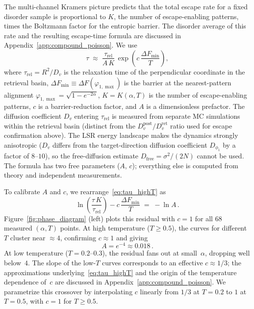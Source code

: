 \documentclass[11pt]{article}
\begin{document}
The multi-channel Kramers picture predicts that the total escape rate for a fixed disorder sample is proportional to $K$, the number of escape-enabling patterns, times the Boltzmann factor for the entropic barrier.  The disorder average of this rate and the resulting escape-time formula are discussed in Appendix~\ref{app:compound_poisson}.  We use
\begin{equation}
\tau \;\approx\; \frac{\tau_{\mathrm{rel}}}{A\,K}\,\exp\!\left(c\,\frac{\Delta F_{\min}}{T}\right),
\label{eq:tau_highT}
\end{equation}
where $\tau_{\mathrm{rel}} = R^2/D_v$ is the relaxation time of the perpendicular coordinate in the retrieval basin, $\Delta F_{\min} \equiv \Delta F(\varphi_{1,\max})$ is the barrier at the nearest-pattern alignment $\varphi_{1,\max} = \sqrt{1-e^{-2\alpha}}$, $K = K(\alpha,T)$ is the number of escape-enabling patterns, $c$ is a barrier-reduction factor, and $A$ is a dimensionless prefactor.  The diffusion coefficient $D_v$ entering $\tau_{\mathrm{rel}}$ is measured from separate MC simulations within the retrieval basin (distinct from the $D_v^{\mathrm{post}}/D_v^{\mathrm{ret}}$ ratio used for escape confirmation above).  The LSR energy landscape makes the dynamics strongly anisotropic ($D_v$ differs from the target-direction diffusion coefficient $D_{\phi_1}$ by a factor of $8$--$10$), so the free-diffusion estimate $D_{\mathrm{free}} = \sigma^2/(2N)$ cannot be used.  The formula has two free parameters ($A$, $c$); everything else is computed from theory and independent measurements.

To calibrate $A$ and $c$, we rearrange~\eqref{eq:tau_highT} as
\begin{equation}
\ln\!\left(\frac{\tau\,K}{\tau_{\mathrm{rel}}}\right) - c\,\frac{\Delta F_{\min}}{T} \;=\; -\ln A\,.
\label{eq:residual}
\end{equation}
Figure~\ref{fig:phase_diagram} (left) plots this residual with $c = 1$ for all $68$ measured $(\alpha, T)$ points.  At high temperature ($T \geq 0.5$), the curves for different~$T$ cluster near $\approx 4$, confirming $c \approx 1$ and giving
\begin{equation}
A = e^{-4} \approx 0.018\,.
\label{eq:A_value}
\end{equation}
At low temperature ($T = 0.2$--$0.3$), the residual fans out at small~$\alpha$, dropping well below~$4$.  The slope of the low-$T$ curves corresponds to an effective $c \approx 1/3$; the approximations underlying~\eqref{eq:tau_highT} and the origin of the temperature dependence of~$c$ are discussed in Appendix~\ref{app:compound_poisson}.  We parametrize this crossover by interpolating $c$ linearly from $1/3$ at $T = 0.2$ to $1$ at $T = 0.5$, with $c = 1$ for $T \geq 0.5$.
\end{document}
